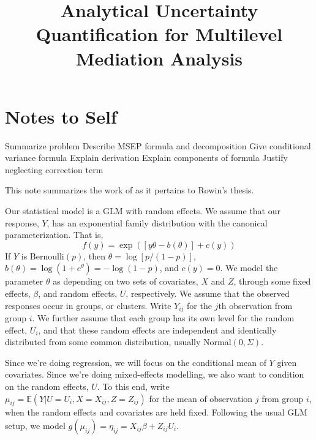 \documentclass{article}
\title{Analytical Uncertainty Quantification for Multilevel Mediation Analysis}
\newcommand{\bE}{\mathbb{E}}
\begin{document}
\maketitle
\section{Notes to Self}
\begin{outline}
    \1 Summarize problem
    \1 Describe MSEP formula and decomposition
    \1 Give conditional variance formula 
        \2 Explain derivation
        \2 Explain components of formula
    \1 Justify neglecting correction term
\end{outline}

This note summarizes the work of \citet{Boo98} as it pertains to Rowin's thesis.

Our statistical model is a GLM with random effects. We assume that our response, $Y$, has an exponential family distribution with the canonical parameterization. That is,
%
\begin{equation}
    f(y) = \exp\left( \left[y \theta - b(\theta)\right] + c(y) \right)
\end{equation}
%
If $Y$ is Bernoulli$(p)$, then $\theta = \log[p/(1-p)]$, $b(\theta) = \log(1 + e^\theta) = -\log(1-p)$, and $c(y) = 0$. We model the parameter $\theta$ as depending on two sets of covariates, $X$ and $Z$, through some fixed effects, $\beta$, and random effects, $U$, respectively. We assume that the observed responses occur in groups, or clusters. Write $Y_{ij}$ for the $j$th observation from group $i$. We further assume that each group has its own level for the random effect, $U_i$, and that these random effects are independent and identically distributed from some common distribution, usually Normal$(0, \Sigma)$.


Since we're doing regression, we will focus on the conditional mean of $Y$ given covariates. Since we're doing mixed-effects modelling, we also want to condition on the random effects, $U$. To this end, write $\mu_{ij} = \bE (Y |U = U_i, X = X_{ij}, Z = Z_{ij})$ for the mean of observation $j$ from group $i$, when the random effects and covariates are held fixed. Following the usual GLM setup, we model $g(\mu_{ij}) = \eta_{ij} = X_{ij} \beta + Z_{ij} U_i$. 
\end{document}

